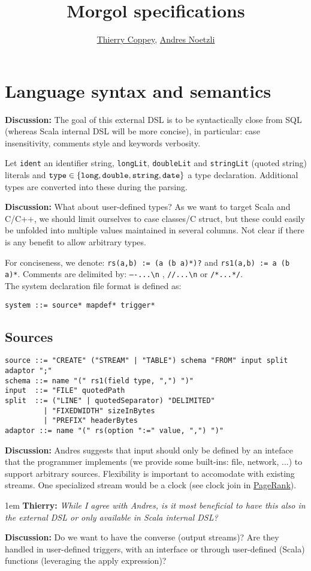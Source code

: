\documentclass[11pt]{article}
\title{Morgol specifications}
\author{\href{mailto:thierry.coppey@epfl.ch}{\color{black} Thierry Coppey},
	\href{mailto:andres.notzli@epfl.ch}{\color{black} Andres Noetzli}}
\newlength{\dlen}
\def\discuss#1{\par\hspace{2em}
\setlength{\dlen}{\textwidth}
\addtolength{\dlen}{-2em}
\begin{minipage}{\dlen}\footnotesize {\bf\color{red} Discussion:} #1\end{minipage}\par}
\def\say#1#2{\begingroup\par\leftskip1em {\bf #1:} \it #2\par\endgroup}
\begin{document}
\tableofcontents
\newpage
\section{Language syntax and semantics}
\discuss{The goal of this external DSL is to be syntactically close from SQL (whereas Scala internal DSL will be more concise), in particular: case insensitivity, comments style and keywords verbosity.}
Let {\tt ident} an identifier string, {\tt longLit}, {\tt doubleLit} and {\tt stringLit} (quoted string) literals and ${\tt type}\in\{{\tt long}, {\tt double}, {\tt string}, {\tt date}\}$ a type declaration. Additional types are converted into these during the parsing.
\discuss{What about user-defined types? As we want to target Scala and C/C++, we should limit ourselves to case classes/C struct, but these could easily be unfolded into multiple values maintained in several columns. Not clear if there is any benefit to allow arbitrary types.}
For conciseness, we denote: \verb$rs(a,b) := (a (b a)*)?$ and \verb$rs1(a,b) := a (b a)*$. Comments are delimited by: {\tt ----...\textbackslash n} , {\tt //...\textbackslash n} or {\tt /*...*/}.\\
The system declaration file format is defined as:
\begin{verbatim}
system ::= source* mapdef* trigger*
\end{verbatim}

\subsection{Sources}
\begin{verbatim}
source ::= "CREATE" ("STREAM" | "TABLE") schema "FROM" input split adaptor ";"
schema ::= name "(" rs1(field type, ",") ")"
input  ::= "FILE" quotedPath
split  ::= ("LINE" | quotedSeparator) "DELIMITED"
         | "FIXEDWIDTH" sizeInBytes
         | "PREFIX" headerBytes
adaptor ::= name "(" rs(option ":=" value, ",") ")"
\end{verbatim}

\discuss{Andres suggests that input should only be defined by an inteface that the programmer implements (we provide some built-ins: file, network, ...) to support arbitrary sources. Flexibility is important to accomodate with existing streams. One specialized stream would be a clock (see clock join in \hyperref[pb:pagerank]{PageRank}).
\say{Thierry}{While I agree with Andres, is it most beneficial to have this also in the external DSL or only available in Scala internal DSL?}
}
\discuss{Do we want to have the converse (output streams)? Are they handled in user-defined triggers, with an interface or through user-defined (Scala) functions (leveraging the apply expression)?}
\end{document}
